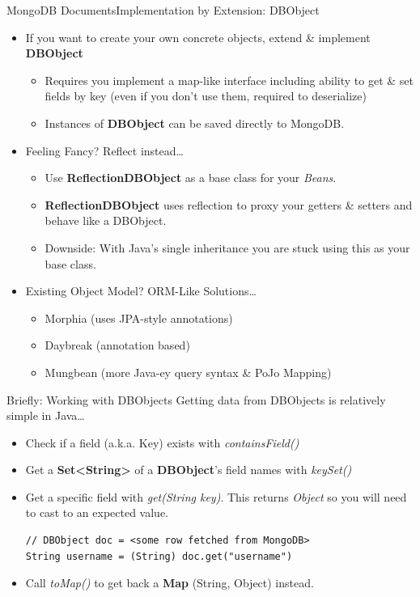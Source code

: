 \documentclass{beamer}
\begin{document}
\begin{frame}{MongoDB Documents}{Implementation by Extension: DBObject}
    \begin{itemize}
        \item<1-> If you want to create your own concrete objects, extend \& implement {\bf DBObject}
            \begin{itemize}
                \item Requires you implement a map-like interface including ability to get \& set fields by key (even if you don't use them, required to deserialize)
                \item Instances of {\bf DBObject} can be saved directly to MongoDB.
            \end{itemize}
        \item<2-> Feeling Fancy? Reflect instead\dots
            \begin{itemize}
                \item Use {\bf ReflectionDBObject} as a base class for your {\em Beans}.
                \item {\bf ReflectionDBObject} uses reflection to proxy your getters \& setters and behave like a DBObject.
                \item Downside: With Java's single inheritance you are stuck using this as your base class.
            \end{itemize}
        \item<3-> Existing Object Model? ORM-Like Solutions\ldots
            \begin{itemize}
                \item Morphia (uses JPA-style annotations)
                \item Daybreak (annotation based)
                \item Mungbean (more Java-ey query syntax & PoJo Mapping)
            \end{itemize}
              
    \end{itemize}
\end{frame}

\begin{frame}[fragile]{Briefly: Working with DBObjects}
    Getting data from DBObjects is relatively simple in Java\ldots
    \begin{itemize}
        \item<2-> Check if a field (a.k.a. Key) exists with {\em containsField()}
        \item<3-> Get a {\bf Set<String>} of a {\bf DBObject}'s field names with {\em keySet()}
        \item<4-> Get a specific field with {\em get(String key)}.  This returns {\em Object} so you will need to cast to an expected value.
\begin{lstlisting}
// DBObject doc = <some row fetched from MongoDB>
String username = (String) doc.get("username")
\end{lstlisting}
        \item<5-> Call {\em toMap()} to get back a {\bf Map} (String, Object) instead.
    \end{itemize}
\end{frame}
\end{document}
